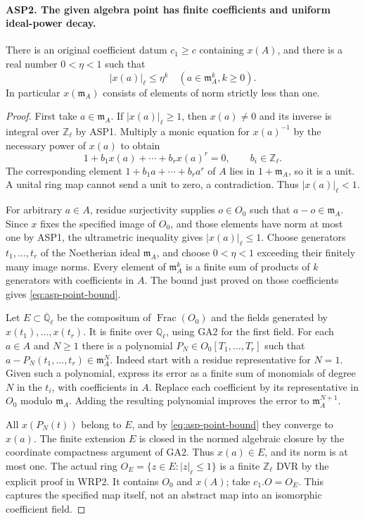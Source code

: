 \paragraph{ASP2. The given algebra point has finite coefficients and uniform ideal-power decay.}
\label{claim:ASP2}
There is an original coefficient datum $c_1\geq c$
containing $x(A)$, and there is a real number
$0<\eta<1$ such that
\begin{equation}\label{eq:asp-point-bound}
            |x(a)|_\ell\leq\eta^k
                  \quad(a\in\mathfrak m_A^k, k\geq0).
\end{equation}
In particular $x(\mathfrak m_A)$ consists of elements
of norm strictly less than one.
\begin{proof}
First take $a\in\mathfrak m_A$.  If $|x(a)|_\ell\geq1$,
then $x(a)\ne0$ and its inverse is integral over
$\mathbb Z_\ell$ by ASP1.  Multiply a monic equation
for $x(a)^{-1}$ by the necessary power of $x(a)$ to obtain
\[
             1+b_1x(a)+\cdots+b_rx(a)^r=0,
                                  \qquad b_i\in\mathbb Z_\ell.
\]
The corresponding element $1+b_1a+\cdots+b_ra^r$ of
$A$ lies in $1+\mathfrak m_A$, so it is a unit.  A
unital ring map cannot send a unit to zero, a
contradiction.  Thus $|x(a)|_\ell<1$.

For arbitrary $a\in A$, residue surjectivity supplies
$o\in O_0$ such that $a-o\in\mathfrak m_A$.  Since
$x$ fixes the specified image of $O_0$, and those
elements have norm at most one by ASP1, the
ultrametric inequality gives $|x(a)|_\ell\leq1$.
Choose generators $t_1,\ldots,t_r$ of the Noetherian
ideal $\mathfrak m_A$, and choose
$0<\eta<1$ exceeding their finitely many image norms.
Every element of $\mathfrak m_A^k$ is a finite sum
of products of $k$ generators with coefficients in
$A$.  The bound just proved on those coefficients
gives \eqref{eq:asp-point-bound}.

Let $E\subset\overline{\mathbb Q}_\ell$ be the
compositum of $\operatorname{Frac}(O_0)$ and the fields
generated by $x(t_1),\ldots,x(t_r)$.  It is finite
over $\mathbb Q_\ell$, using GA2 for the first field.
For each $a\in A$ and $N\geq1$ there is a polynomial
$P_N\in O_0[T_1,\ldots,T_r]$ such that
$a-P_N(t_1,\ldots,t_r)\in\mathfrak m_A^N$.
Indeed start with a residue representative for $N=1$.
Given such a polynomial, express its error as a finite
sum of monomials of degree $N$ in the $t_i$, with
coefficients in $A$.  Replace each coefficient by
its representative in $O_0$ modulo $\mathfrak m_A$.
Adding the resulting polynomial improves the error
to $\mathfrak m_A^{N+1}$.

All $x(P_N(t))$ belong to $E$, and by
\eqref{eq:asp-point-bound} they converge to $x(a)$.
The finite extension $E$ is closed in the normed
algebraic closure by the coordinate compactness
argument of GA2.  Thus $x(a)\in E$, and its norm is
at most one.  The actual ring
$O_E=\{z\in E:|z|_\ell\leq1\}$ is a finite
$\mathbb Z_\ell$ DVR by the explicit proof in WRP2.
It contains $O_0$ and $x(A)$; take $c_1.O=O_E$.
This captures the specified map itself, not an
abstract map into an isomorphic coefficient field.
\end{proof}

